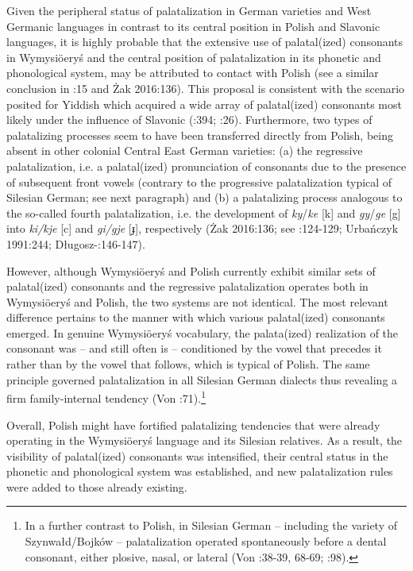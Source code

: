 \documentclass[output=paper]{langscibook}
\begin{document}
Given the peripheral status of palatalization in German varieties and West Germanic languages in contrast to its central position in Polish and Slavonic languages, it is highly probable that the extensive use of palatal(ized) consonants in Wymysiöeryś and the central position of palatalization in its phonetic and phonological system, may be attributed to contact with Polish (see a similar conclusion in \citealt{Kleczkowski1920}:15 and Żak 2016:136). This proposal is consistent with the scenario posited for Yiddish which acquired a wide array of palatal(ized) consonants most likely under the influence of Slavonic (\citealt{JacobsEtAl1994}:394; \citealt{Harbert2007}:26). Furthermore, two types of palatalizing processes seem to have been transferred directly from Polish, being absent in other colonial Central East German varieties: (a) the regressive palatalization, i.e. a palatal(ized) pronunciation of consonants due to the presence of subsequent front vowels (contrary to the progressive palatalization typical of Silesian German; see next paragraph) and (b) a palatalizing process analogous to the so-called fourth palatalization, i.e. the development of \textit{ky}/\textit{ke} [k] and \textit{gy}/\textit{ge} [g] into \textit{ki/kje} [c] and \textit{gi/gje} [ɟ], respectively (Żak 2016:136; see \citealt{Dejna1973}:124-129; Urbańczyk 1991:244; Długosz-\citealt{KurczabowaDubisz2006}:146-147).

However, although Wymysiöeryś and Polish currently exhibit similar sets of palatal(ized) consonants and the regressive palatalization operates both in Wymysiöeryś and Polish, the two systems are not identical. The most relevant difference pertains to the manner with which various palatal(ized) consonants emerged. In genuine Wymysiöeryś vocabulary, the palata(ized) realization of the consonant was – and still often is – conditioned by the vowel that precedes it \citep[125]{Kleczkowski1920} rather than by the vowel that follows, which is typical of Polish. The same principle governed palatalization in all Silesian German dialects thus revealing a firm family-internal tendency (Von \citealt{Unwerth1908}:71).\footnote{In a further contrast to Polish, in Silesian German – including the variety of Szynwałd/Bojków – palatalization operated spontaneously before a dental consonant, either plosive, nasal, or lateral (Von \citealt{Unwerth1908}:38-39, 68-69; \citealt{Gusinde1911}:98).}

Overall, Polish might have fortified palatalizing tendencies that were already operating in the Wymysiöeryś language and its Silesian relatives. As a result, the visibility of palatal(ized) consonants was intensified, their central status in the phonetic and phonological system was established, and new palatalization rules were added to those already existing.
\end{document}
